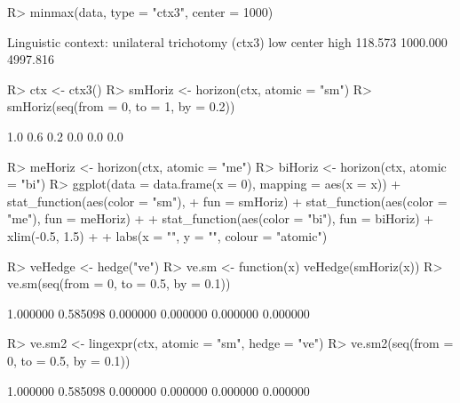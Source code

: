 \documentclass{article}\usepackage[]{graphicx}\usepackage[]{color}
\begin{document}
\begin{Schunk}
% --begin: "minmax2"
\begin{Sinput}
R> minmax(data, type = "ctx3", center = 1000)
\end{Sinput}
\begin{Soutput}
Linguistic context: unilateral trichotomy (ctx3)
     low   center     high 
 118.573 1000.000 4997.816 
\end{Soutput}
%
% --end: "minmax2"
\end{Schunk}

\begin{Schunk}
% --begin: "horizon"
\begin{Sinput}
R> ctx <- ctx3()
R> smHoriz <- horizon(ctx, atomic = "sm")
R> smHoriz(seq(from = 0, to = 1, by = 0.2))
\end{Sinput}
\begin{Soutput}
[1] 1.0 0.6 0.2 0.0 0.0 0.0
\end{Soutput}
%
% --end: "horizon"
\end{Schunk}

\begin{Schunk}
\begin{Sinput}
R> meHoriz <- horizon(ctx, atomic = "me")
R> biHoriz <- horizon(ctx, atomic = "bi")
R> ggplot(data = data.frame(x = 0), mapping = aes(x = x)) + stat_function(aes(color = "sm"), 
+      fun = smHoriz) + stat_function(aes(color = "me"), fun = meHoriz) + 
+      stat_function(aes(color = "bi"), fun = biHoriz) + xlim(-0.5, 1.5) + 
+      labs(x = "", y = "", colour = "atomic\nexpression")
\end{Sinput}
\end{Schunk}

\begin{Schunk}
% --begin: "hedge"
\begin{Sinput}
R> veHedge <- hedge("ve")
R> ve.sm <- function(x) veHedge(smHoriz(x))
R> ve.sm(seq(from = 0, to = 0.5, by = 0.1))
\end{Sinput}
\begin{Soutput}
[1] 1.000000 0.585098 0.000000 0.000000 0.000000 0.000000
\end{Soutput}
%
% --end: "hedge"
\end{Schunk}


\begin{Schunk}
% --begin: "lingexpr"
\begin{Sinput}
R> ve.sm2 <- lingexpr(ctx, atomic = "sm", hedge = "ve")
R> ve.sm2(seq(from = 0, to = 0.5, by = 0.1))
\end{Sinput}
\begin{Soutput}
[1] 1.000000 0.585098 0.000000 0.000000 0.000000 0.000000
\end{Soutput}
%
% --end: "lingexpr"
\end{Schunk}
\end{document}
